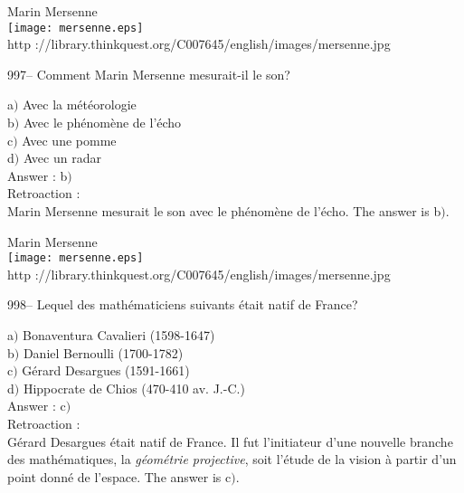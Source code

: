 ﻿\documentclass[letterpaper, 12pt]{article}
\begin{document}
        \begin{center}
        Marin Mersenne\\
    \texttt{[image: mersenne.eps]}\\
        {\footnotesize http
://library.thinkquest.org/C007645/english/images/mersenne.jpg}
    \end{center}

997-- Comment Marin Mersenne mesurait-il le son?

a$)$ Avec la m\'et\'eorologie \\
b$)$ Avec le ph\'enom\`ene de l'\'echo \\
c$)$ Avec une pomme \\
d$)$ Avec un radar\\

Answer : b$)$\\

Retroaction : \\
Marin Mersenne mesurait le son avec le ph\'enom\`ene de l'\'echo.
The answer is b$)$.\\

        \begin{center}
        Marin Mersenne\\
    \texttt{[image: mersenne.eps]}\\
        {\footnotesize http
://library.thinkquest.org/C007645/english/images/mersenne.jpg}
    \end{center}

998-- Lequel des math\'ematiciens suivants \'etait natif de France?

a$)$ Bonaventura Cavalieri (1598-1647) \\
b$)$ Daniel Bernoulli (1700-1782) \\
c$)$ G\'erard Desargues (1591-1661) \\
d$)$ Hippocrate de Chios (470-410 av. J.-C.)\\

Answer : c$)$\\

Retroaction : \\
G\'erard Desargues \'etait natif de France. Il fut l'initiateur
d'une nouvelle branche des math\'ematiques, la {\sl g\'eom\'etrie
projective}, soit l'\'etude de la vision \`a partir d'un point
donn\'e de l'espace.
The answer is c$)$.\\

\end{document}
